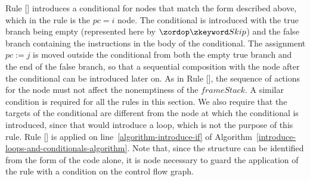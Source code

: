 Rule [] introduces a conditional for
nodes that match the form described above, which in the rule is the
$pc = i$ node.
The conditional is introduced with the true branch being empty
(represented here by $\Skip$) and the false branch containing the
instructions in the body of the conditional.
The assignment $pc := j$ is moved outside the conditional from both
the empty true branch and the end of the false branch, so that a
sequential composition with the node after the conditional can be
introduced later on.
As in Rule [], the sequence of
actions for the node must not affect the nonemptiness of the
$frameStack$.
A similar condition is required for all the rules in this section.
We also require that the targets of the conditional are different from
the node at which the conditional is introduced, since that would
introduce a loop, which is not the purpose of this rule.
Rule [] is applied on
line~\ref{algorithm-introduce-if} of
Algorithm~\ref{introduce-loops-and-conditionals-algorithm}.
Note that, since the structure can be identified from the form of the
\Circus{} code alone, it is node necessary to guard the application of
the rule with a condition on the control flow graph.

